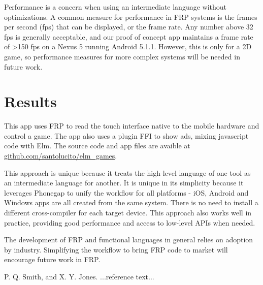 \documentclass[preprint]{sigplanconf}
\begin{document}
Performance is a concern when using an intermediate language without optimizations. 
A common measure for performance in FRP systems is the frames per second (fps) that can be displayed, or the frame rate.
Any number above 32 fps is generally acceptable, and our proof of concept app maintains a frame rate of >150 fps on a Nexus 5 running Android 5.1.1.
However, this is only for a 2D game, so performance measures for more complex systems will be needed in future work.

\section{Results}
This app uses FRP to read the touch interface native to the mobile hardware and control a game.
The app also uses a plugin FFI to show ads, mixing javascript code with Elm.
The source code and app files are avaible at \url{github.com/santolucito/elm_games}.

This approach is unique because it treats the high-level language of one tool as an intermediate language for another. 
It is unique in its simplicity because it leverages Phonegap to unify the workflow for all platforms - iOS, Android and Windows apps are all created from the same system.
There is no need to install a different cross-compiler for each target device.
This approach also works well in practice, providing good performance and access to low-level APIs when needed.

 
The development of FRP and functional languages in general relies on adoption by industry.
Simplifying the workflow to bring FRP code to market will encourage future work in FRP.





\begin{thebibliography}{}
\softraggedright

P. Q. Smith, and X. Y. Jones. ...reference text...

\end{thebibliography}
\end{document}
